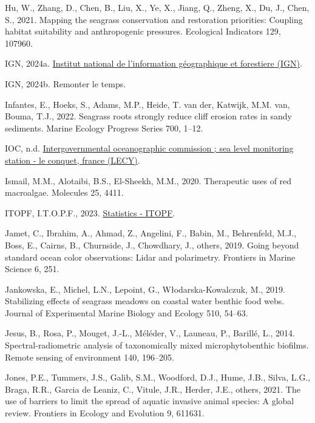 \documentclass[
  letterpaper,
  11pt,
  english,
  singlespacing,
  headsepline]{MastersDoctoralThesis}
\newlength{\cslhangindent}
\newenvironment{CSLReferences}[2] %
 {\begin{list}{}{%
  \setlength{\itemindent}{0pt}
  \setlength{\leftmargin}{0pt}
  \setlength{\parsep}{0pt}
  \ifodd #1
   \setlength{\leftmargin}{\cslhangindent}
   \setlength{\itemindent}{-1\cslhangindent}
  \fi
  \setlength{\itemsep}{#2\baselineskip}}}
 {\end{list}}
\begin{document}
\begin{CSLReferences}{1}{0}
Hu, W., Zhang, D., Chen, B., Liu, X., Ye, X., Jiang, Q., Zheng, X., Du,
J., Chen, S., 2021. Mapping the seagrass conservation and restoration
priorities: Coupling habitat suitability and anthropogenic pressures.
Ecological Indicators 129, 107960.

IGN, 2024a. \href{https://www.ign.fr}{Institut national de l'information
géographique et forestiere (IGN)}.

IGN, 2024b. Remonter le temps.

Infantes, E., Hoeks, S., Adams, M.P., Heide, T. van der, Katwijk, M.M.
van, Bouma, T.J., 2022. Seagrass roots strongly reduce cliff erosion
rates in sandy sediments. Marine Ecology Progress Series 700, 1--12.

IOC, n.d.
\href{https://www.ioc-sealevelmonitoring.org/station.php?code\%20=\%20lecy}{Intergovernmental
oceanographic commission ; sea level monitoring station - le conquet,
france (LECY)}.

Ismail, M.M., Alotaibi, B.S., El-Sheekh, M.M., 2020. Therapeutic uses of
red macroalgae. Molecules 25, 4411.

ITOPF, I.T.O.P.F., 2023.
\href{https://www.itopf.org/knowledge-resources/data-statistics/statistics/}{Statistics
- ITOPF}.

Jamet, C., Ibrahim, A., Ahmad, Z., Angelini, F., Babin, M., Behrenfeld,
M.J., Boss, E., Cairns, B., Churnside, J., Chowdhary, J., others, 2019.
Going beyond standard ocean color observations: Lidar and polarimetry.
Frontiers in Marine Science 6, 251.

Jankowska, E., Michel, L.N., Lepoint, G., Włodarska-Kowalczuk, M., 2019.
Stabilizing effects of seagrass meadows on coastal water benthic food
webs. Journal of Experimental Marine Biology and Ecology 510, 54--63.

Jesus, B., Rosa, P., Mouget, J.-L., Méléder, V., Launeau, P., Barillé,
L., 2014. Spectral-radiometric analysis of taxonomically mixed
microphytobenthic biofilms. Remote sensing of environment 140, 196--205.

Jones, P.E., Tummers, J.S., Galib, S.M., Woodford, D.J., Hume, J.B.,
Silva, L.G., Braga, R.R., Garcia de Leaniz, C., Vitule, J.R., Herder,
J.E., others, 2021. The use of barriers to limit the spread of aquatic
invasive animal species: A global review. Frontiers in Ecology and
Evolution 9, 611631.


\end{CSLReferences}
\end{document}
